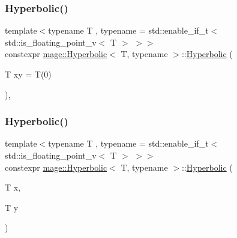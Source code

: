 \subsubsection{\texorpdfstring{Hyperbolic()}{Hyperbolic()}\hspace{0.1cm}{\footnotesize\ttfamily [1/5]}}
{\footnotesize\ttfamily template$<$typename T , typename  = std\+::enable\+\_\+if\+\_\+t$<$ std\+::is\+\_\+floating\+\_\+point\+\_\+v$<$ T $>$ $>$$>$ \\
constexpr \mbox{\hyperlink{structmage_1_1_hyperbolic}{mage\+::\+Hyperbolic}}$<$ T, typename $>$\+::\mbox{\hyperlink{structmage_1_1_hyperbolic}{Hyperbolic}} (\begin{DoxyParamCaption}\item[{T}]{xy = {\ttfamily T(0)} }\end{DoxyParamCaption})\hspace{0.3cm}{\ttfamily [explicit]}, {\ttfamily [noexcept]}}

\mbox{\label{structmage_1_1_hyperbolic_ad4ae65501723843bd7258f94a724b01c}} 
\subsubsection{\texorpdfstring{Hyperbolic()}{Hyperbolic()}\hspace{0.1cm}{\footnotesize\ttfamily [2/5]}}
{\footnotesize\ttfamily template$<$typename T , typename  = std\+::enable\+\_\+if\+\_\+t$<$ std\+::is\+\_\+floating\+\_\+point\+\_\+v$<$ T $>$ $>$$>$ \\
constexpr \mbox{\hyperlink{structmage_1_1_hyperbolic}{mage\+::\+Hyperbolic}}$<$ T, typename $>$\+::\mbox{\hyperlink{structmage_1_1_hyperbolic}{Hyperbolic}} (\begin{DoxyParamCaption}\item[{T}]{x,  }\item[{T}]{y }\end{DoxyParamCaption})\hspace{0.3cm}{\ttfamily [noexcept]}}

\mbox{\label{structmage_1_1_hyperbolic_a4f0508de351703405ade230dc4d6b77b}} 
